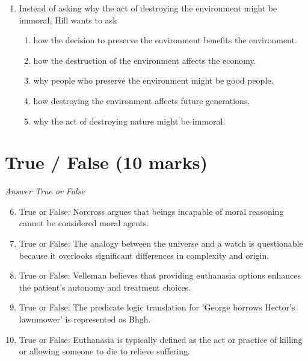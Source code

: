 \documentclass[12pt]{article}
\begin{document}
\begin{enumerate}[label=\arabic*.]
\begin{enumerate}[label=(\alph*)]
    \item a capacity for emotional intelligence
    \item a capacity for scientific understanding
    \item a capacity for communal or friendly relationships
    \item a capacity for certain kinds of feelings or sentiments
    \item a capacity for independent thinking
\end{enumerate}
\item Instead of asking why the act of destroying the environment might be immoral, Hill wants to ask
\begin{enumerate}[label=(\alph*)]
    \item how the decision to preserve the environment benefits the environment.
    \item how the destruction of the environment affects the economy.
    \item why people who preserve the environment might be good people.
    \item how destroying the environment affects future generations.
    \item why the act of destroying nature might be immoral.
\end{enumerate}
\end{enumerate}

\section*{True / False (10 marks)}
\textit{Answer True or False}
\begin{enumerate}[label=\arabic*.]
\setcounter{enumi}{5}
\item True or False: Norcross argues that beings incapable of moral reasoning cannot be considered moral agents.
\item True or False: The analogy between the universe and a watch is questionable because it overlooks significant differences in complexity and origin.
\item True or False: Velleman believes that providing euthanasia options enhances the patient's autonomy and treatment choices.
\item True or False: The predicate logic translation for 'George borrows Hector's lawnmower' is represented as Bhgh.
\item True or False: Euthanasia is typically defined as the act or practice of killing or allowing someone to die to relieve suffering.
\end{enumerate}
\end{document}
